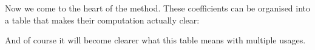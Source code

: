 Now we come to the heart of the method. These coefficients can be organised into a table that makes their computation actually clear:

\noindent {}

And of course it will become clearer what this table means with multiple usages.

